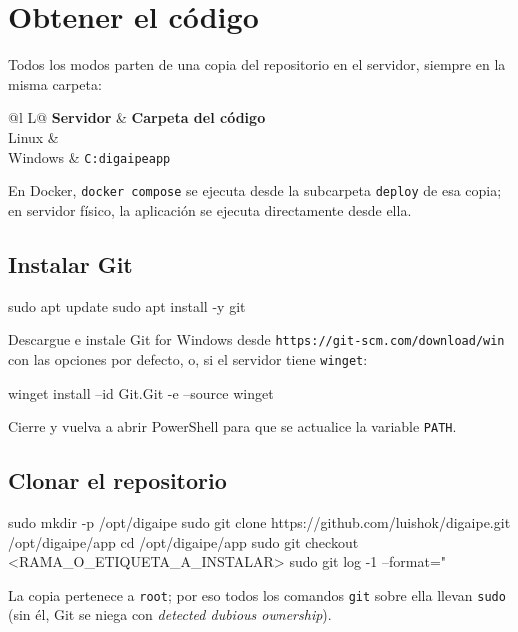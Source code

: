 \chapter{Obtener el código}
\label{cap:preparacion}

Todos los modos parten de una copia del repositorio en el servidor, siempre en la misma carpeta:

\begin{xltabular}{\linewidth}{@{}l L@{}}
	\toprule
	\textbf{Servidor} & \textbf{Carpeta del código} \\
	\midrule
	\endhead
	Linux &  \\
	Windows & \texttt{C:\bs digaipe\bs app} \\
	\bottomrule
\end{xltabular}

En Docker, \texttt{docker compose} se ejecuta desde la subcarpeta \texttt{deploy} de esa copia;
en servidor físico, la aplicación se ejecuta directamente desde ella.

\section{Instalar Git}

\begin{codigo}
sudo apt update
sudo apt install -y git
\end{codigo}

 Descargue e instale Git for Windows desde \texttt{https://git-scm.com/download/win}
con las opciones por defecto, o, si el servidor tiene \texttt{winget}:
\begin{codigo}
winget install --id Git.Git -e --source winget
\end{codigo}
Cierre y vuelva a abrir PowerShell para que se actualice la variable \texttt{PATH}.

\section{Clonar el repositorio}

\begin{codigo}
sudo mkdir -p /opt/digaipe
sudo git clone https://github.com/luishok/digaipe.git /opt/digaipe/app
cd /opt/digaipe/app
sudo git checkout <RAMA_O_ETIQUETA_A_INSTALAR>
sudo git log -1 --format="%
\end{codigo}

La copia pertenece a \texttt{root}; por eso todos los comandos \texttt{git} sobre ella llevan
\texttt{sudo} (sin él, Git se niega con \emph{detected dubious ownership}).


